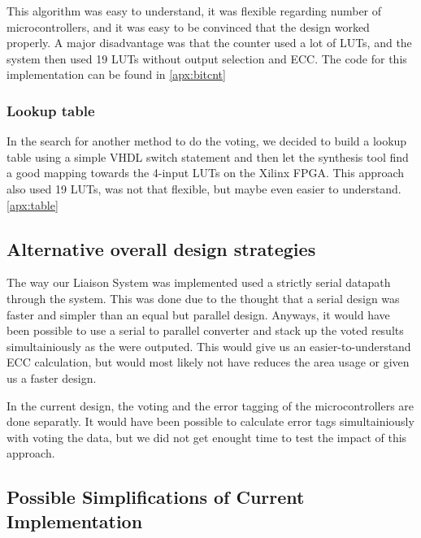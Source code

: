 This algorithm was easy to understand, it was flexible regarding number of microcontrollers, and it was easy
to be convinced that the design worked properly. A major disadvantage was that the counter used a lot of
LUTs, and the system then used 19 LUTs without output selection and ECC. The code for this implementation can
be found in \autoref{apx:bitcnt}

\subsubsection{Lookup table}
In the search for another method to do the voting, we decided to build a lookup table using
a simple VHDL switch statement and then let the synthesis tool find a good mapping towards
the 4-input LUTs on the Xilinx FPGA. This approach also used 19 LUTs, was not that flexible,
but maybe even easier to understand.\autoref{apx:table}

\subsection{Alternative overall design strategies}
The way our Liaison System was implemented used a strictly serial datapath through the
system. This was done due to the thought that a serial design was faster and simpler
than an equal but parallel design. Anyways, it would have been possible to
use a serial to parallel converter and stack up the voted results simultainiously as
the were outputed. This would give us an easier-to-understand ECC calculation, but would most likely
not have reduces the area usage or given us a faster design.

In the current design, the voting and the error tagging of the microcontrollers are done
separatly. It would have been possible to calculate error tags simultainiously with voting
the data, but we did not get enought time to test the impact of this approach.

\subsection{Possible Simplifications of Current Implementation}

